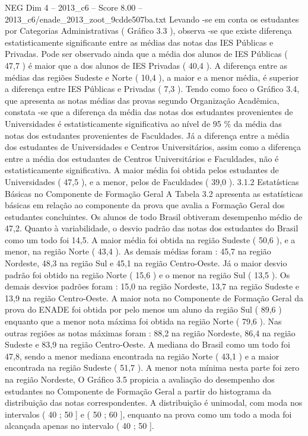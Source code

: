\begin{textsample}{NEG Dim 4 – 2013\_c6 – Score 8.00 – 2013\_c6/enade\_2013\_zoot\_9cdde507ba.txt}
Levando -se em conta os estudantes por Categorias Administrativas ( Gráfico 3.3 ), observa -se que existe diferença estatisticamente significante entre as médias das notas das IES Públicas e Privadas.
Pode ser observado ainda que a média dos alunos de IES Públicas ( 47,7 ) é maior que a dos alunos de IES Privadas ( 40,4 ).
A diferença entre as médias das regiões Sudeste e Norte ( 10,4 ), a maior e a menor média, é superior a diferença entre IES Públicas e Privadas ( 7,3 ).
Tendo como foco o Gráfico 3.4, que apresenta as notas médias das provas segundo Organização Acadêmica, constata -se que a diferença da média das notas dos estudantes provenientes de Universidades é estatisticamente significativa ao nível de 95 \% da média das notas dos estudantes provenientes de Faculdades.
Já a diferença entre a média dos estudantes de Universidades e Centros Universitários, assim como a diferença entre a média dos estudantes de Centros Universitários e Faculdades, não é estatisticamente significativa.
A maior média foi obtida pelos estudantes de Universidades ( 47,5 ), e a menor, pelos de Faculdades ( 39,0 ). 3.1.2 Estatísticas Básicas no Componente de Formação Geral A Tabela 3.2 apresenta as estatísticas básicas em relação ao componente da prova que avalia a Formação Geral dos estudantes concluintes.
Os alunos de todo Brasil obtiveram desempenho médio de 47,2.
Quanto à variabilidade, o desvio padrão das notas dos estudantes do Brasil como um todo foi 14,5.
A maior média foi obtida na região Sudeste ( 50,6 ), e a menor, na região Norte ( 43,4 ).
As demais médias foram : 45,7 na região Nordeste, 48,3 na região Sul e 45,1 na região Centro-Oeste.
Já o maior desvio padrão foi obtido na região Norte ( 15,6 ) e o menor na região Sul ( 13,5 ).
Os demais desvios padrões foram : 15,0 na região Nordeste, 13,7 na região Sudeste e 13,9 na região Centro-Oeste.
A maior nota no Componente de Formação Geral da prova do ENADE foi obtida por pelo menos um aluno da região Sul ( 89,6 ) enquanto que a menor nota máxima foi obtida na região Norte ( 79,6 ).
Nas outras regiões as notas máximas foram : 88,2 na região Nordeste, 86,4 na região Sudeste e 83,9 na região Centro-Oeste.
A mediana do Brasil como um todo foi 47,8, sendo a menor mediana encontrada na região Norte ( 43,1 ) e a maior encontrada na região Sudeste ( 51,7 ).
A menor nota mínima nesta parte foi zero na região Nordeste, O Gráfico 3.5 propicia a avaliação do desempenho dos estudantes no Componente de Formação Geral a partir do histograma da distribuição das notas correspondentes.
A distribuição é unimodal, com moda nos intervalos ( 40 ; 50 ] e ( 50 ; 60 ], enquanto na prova como um todo a moda foi alcançada apenas no intervalo ( 40 ; 50 ].

\end{textsample}
